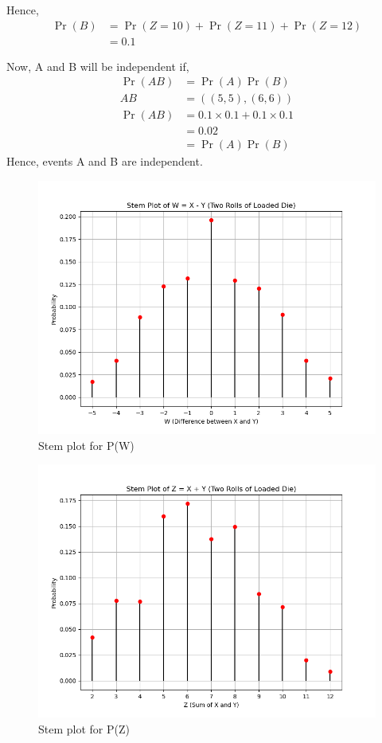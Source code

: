 \documentclass[]{article}
\begin{document}
Hence,
\begin{align}
\Pr(B) &= \Pr(Z=10) + \Pr(Z=11) + \Pr(Z=12)\\
&= 0.1
\end{align}

Now, A and B will be independent if,
\begin{align}
\Pr(AB) &= \Pr(A)\Pr(B)\\
AB &= ((5,5), (6,6)) \\
\Pr(AB) &= 0.1 \times 0.1 + 0.1 \times 0.1\\
&= 0.02\\
&= \Pr(A)\Pr(B)
\end{align}
Hence, events A and B are independent.
\begin{figure}
\includegraphics[width=\columnwidth]{./figs/W.png}
\caption{Stem plot for P(W)}
\label{fig:exemplar/12/13/3/1/W/}
\end{figure}
\begin{figure}
\includegraphics[width=\columnwidth]{./figs/Z.png}
\caption{Stem plot for P(Z)}
\label{fig:exemplar/12/13/3/1/Z/}
\end{figure}
\end{document}
